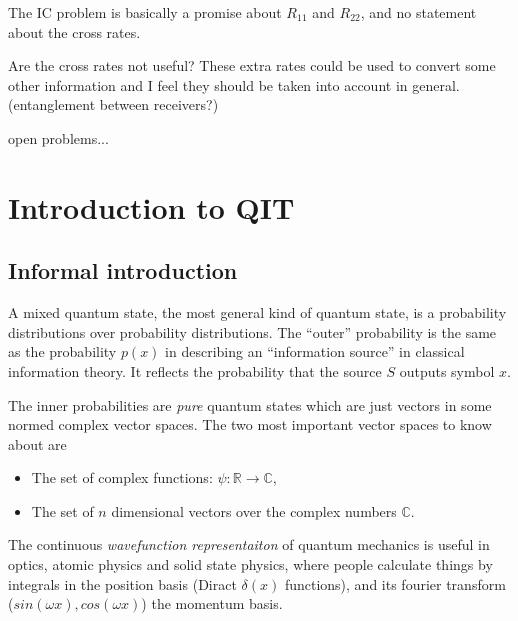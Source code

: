 \documentclass[aps,11pt,twoside,letterpaper]{article}
\def\c{\mathbb{C}}
\theoremstyle{plain}
\theoremstyle{definition}
\begin{document}
        The IC problem is basically a promise about $R_{11}$ and $R_{22}$,
        and no statement about the cross rates.
        
        Are the cross rates not useful? 
        These extra rates could be used to convert some other information 
        and I feel they should be taken into account in general.
        (entanglement between receivers?)



    open problems...



\appendix


\section{Introduction to QIT}


    \subsection{Informal introduction}

        A mixed quantum state, the most general kind of quantum state, is a
        probability distributions over probability distributions.
        The ``outer'' probability is the same as the probability $p(x)$ in describing 
        an ``information source'' in classical information theory.
        It reflects the probability that the source $S$ outputs symbol $x$.

        The inner probabilities are \emph{pure} quantum states 
        which are just vectors in some normed complex vector spaces.
        The two most important vector spaces to know about are  
        \begin{itemize}
            \item   The set of complex functions: $\psi \colon \mathbb{R} \to \mathbb{C} $,
            \item   The set of $n$ dimensional vectors over the complex numbers $\c$.
        \end{itemize}
        The continuous \emph{wavefunction representaiton} of quantum mechanics is useful in optics,
        atomic physics and solid state physics, where people calculate things by integrals in 
        the position basis (Diract $\delta(x)$ functions),
        and its fourier transform ($sin(\omega x),cos(\omega x)$) the momentum basis.
\end{document}
